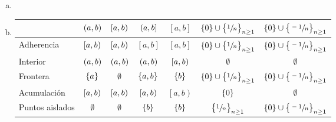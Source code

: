 \begin{eje}
\begin{enumerate}[(a)]
\begin{enumerate}[i)]
                    y por tanto $\forall x \in \left[ a, b \rp \cap \left[ c, d \rp, x \in \left[ \alpha, \beta \rp \subseteq \left[ a, b \rp \cap \left[ c, d \rp$, y $\left[ \alpha, \beta \rp \in \B$.
            \end{enumerate}
        \item \item[] %
            \begin{center}
                \begin{tabular}{|l||c|c|c|c|c|c|} \hline
                    & $\left( a, b \right)$ & $\left[ a, b \right)$ & $\left( a, b \right]$ & $\left[ a,b \right]$ & $\left\{ 0 \right\} \cup \left\{ \sfrac{1}{n} \right\}_{n\geq 1}$ & $\left\{ 0 \right\} \cup \left\{ \sfrac{-1}{n} \right\}_{n\geq 1}$ \\ \hline \hline
                    Adherencia & $\left[a,b\right)$ & $\left[ a, b \right)$ & $\left[ a, b \right]$ & $\left[ a, b \right]$ & $\left\{ 0 \right\} \cup \left\{ \sfrac{1}{n} \right\}_{n\geq 1}$ & $\left\{ 0 \right\} \cup \left\{ \sfrac{-1}{n} \right\}_{n\geq 1}$ \\ \hline
                    Interior & $\left( a, b \right)$ & $\left( a, b \right)$ & $\left( a, b \right)$ & $\left[ a, b \right)$ & $\emptyset$ & $\emptyset$ \\ \hline
                    Frontera & $\left\{ a \right\}$ & $\emptyset$ & $\left\{ a, b \right\}$ & $\left\{ b \right\}$ & $\left\{ 0 \right\} \cup \left\{ \sfrac{1}{n} \right\}_{n\geq 1}$ & $\left\{ 0 \right\} \cup \left\{ \sfrac{-1}{n} \right\}_{n\geq 1}$ \\ \hline
                    Acumulación & $\left[a,b\right)$ & $\left[ a, b \right)$ & $\left[ a, b \right)$ & $\left[ a, b \right)$ & $\left\{ 0 \right\}$ & $\emptyset$ \\ \hline
                    Puntos aislados & $\emptyset$ & $\emptyset$ & $\left\{ b \right\}$ & $\left\{ b \right\}$ & $\left\{ \sfrac{1}{n} \right\}_{n\geq 1}$ & $\left\{ 0 \right\} \cup \left\{ \sfrac{-1}{n} \right\}_{n\geq 1}$ \\ \hline
                \end{tabular}
            \end{center}
    \end{enumerate}
\end{eje}
